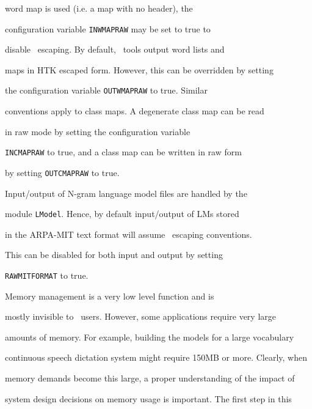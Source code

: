 word map is used (i.e. a map with no header), the 


configuration variable \texttt{INWMAPRAW} may be set to true to


disable \HTK\ escaping. By default, \HLM\ tools output word lists and


maps in HTK escaped form.  However, this can be overridden by setting


the configuration variable \texttt{OUTWMAPRAW} to true.  Similar


conventions apply to class maps.  A degenerate class map can be read


in raw mode by setting the  configuration variable


\texttt{INCMAPRAW} to true, and a class map can be written in raw form


by setting \texttt{OUTCMAPRAW} to  true.





Input/output of N-gram language model files are handled by the \HLM\


module \texttt{LModel}. Hence, by default input/output of LMs stored


in the ARPA-MIT text format will assume \HTK\ escaping conventions.


This can be disabled for both input and output by setting 


\texttt{RAWMITFORMAT} to true.















Memory management is a very low level function and is


mostly invisible to \HTK\ users.  However, some applications require very large


amounts of memory.  For example, building the models for a large vocabulary


continuous speech dictation system might require 150MB or more.  Clearly, when


memory demands become this large, a proper understanding of the impact of


system design decisions on memory usage is important.  The first step in this


